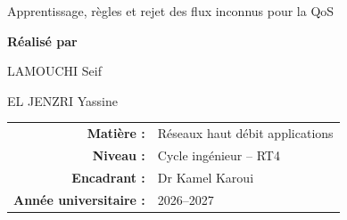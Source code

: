 \documentclass[12pt,a4paper]{report}
\begin{document}
\begin{titlepage}
{\Large
Apprentissage, règles et rejet des flux inconnus pour la QoS
\par}

\vspace{.75cm}

{\Large\textbf{Réalisé par}\par}
\vspace{.25cm}

{\Large LAMOUCHI Seif\par}
\vspace{.08cm}
{\Large EL JENZRI Yassine\par}

\vfill

\begin{tabular}{rl}
\textbf{Matière :} & Réseaux haut débit applications\\
\textbf{Niveau :} & Cycle ingénieur -- RT4 \\
\textbf{Encadrant :} & Dr Kamel Karoui\\
\textbf{Année universitaire :} & 2026--2027
\end{tabular}

\vspace{.45cm}

\end{titlepage}

\clearpage
{}


\tableofcontents
\listoffigures
\listoftables








\end{document}
